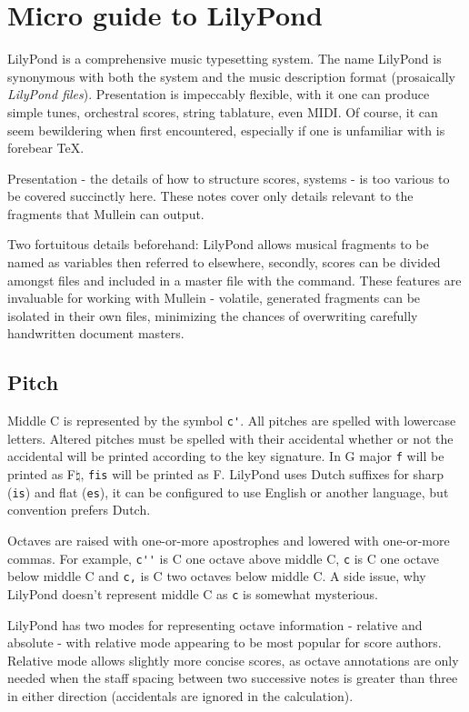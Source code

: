 \documentclass{article}
\begin{document}
\section{Micro guide to LilyPond}
LilyPond is a comprehensive music typesetting system. The name 
LilyPond is synonymous with both the system and the music 
description format (prosaically \emph{LilyPond files}).
Presentation is impeccably flexible, with it one can produce 
simple tunes, orchestral scores, string tablature, even MIDI. Of 
course, it can seem bewildering when first encountered, 
especially if one is unfamiliar with is forebear \TeX.

Presentation - the details of how to structure scores, systems - 
is too various to be covered succinctly here. These notes cover 
only details relevant to the fragments that Mullein can output.

Two fortuitous details beforehand: LilyPond allows musical 
fragments to be named as variables then referred to elsewhere,
secondly, scores can be divided amongst files and included in a
master file with the \verb++ command. These features are 
invaluable for working with Mullein - volatile, generated 
fragments can be isolated in their own files, minimizing the 
chances of overwriting carefully handwritten document masters.
 
\subsection{Pitch}
Middle C is represented by the symbol \verb+c'+. All pitches 
are spelled with lowercase letters. Altered pitches must 
be spelled with their accidental whether or not the accidental 
will be printed according to the key signature. In G major
\verb+f+ will be printed as F$\natural$, \verb+fis+ will be
printed as F. LilyPond uses Dutch suffixes for sharp 
(\verb+is+) and flat (\verb+es+), it can be configured to use
English or another language, but convention prefers Dutch.

Octaves are raised with one-or-more apostrophes and lowered 
with one-or-more commas. For example, \verb+c''+ is C one octave 
above middle C, \verb+c+ is C one octave below middle C and 
\verb+c,+ is C two octaves below middle C. A side issue, why 
LilyPond doesn't represent middle C as \verb+c+ is somewhat 
mysterious.

LilyPond has two modes for representing octave information - 
relative and absolute - with relative mode appearing to be most 
popular for score authors. Relative mode allows slightly more 
concise scores, as octave annotations are only needed when the 
staff spacing between two successive notes is greater than three 
in either direction (accidentals are ignored in the calculation).
\end{document}
